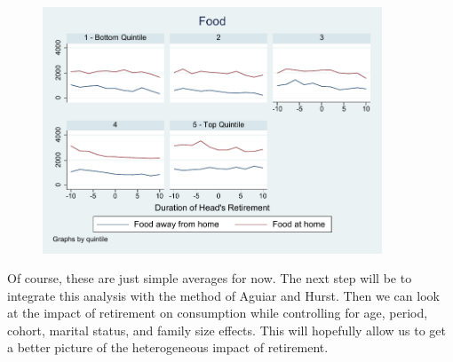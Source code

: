 \documentclass[11pt,onecolumn]{article}
\begin{document}
\begin{figure}[h]
	\centering
	\includegraphics[width=0.9\textwidth]{../ConsumptionPostRetirement/food.pdf}
\end{figure}

Of course, these are just simple averages for now. The next step will be to integrate this analysis with the method of Aguiar and Hurst. Then we can look at the impact of retirement on consumption while controlling for age, period, cohort, marital status, and family size effects. This will hopefully allow us to get a better picture of the heterogeneous impact of retirement.
\end{document}
